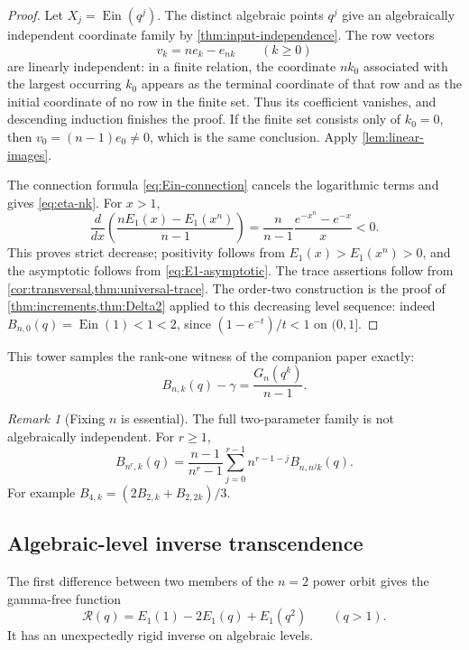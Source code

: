 \documentclass[11pt]{article}
\theoremstyle{definition}
\theoremstyle{remark}
\newtheorem{remark}[theorem]{Remark}
\newcommand{\Ein}{\operatorname{Ein}}
\begin{document}
\begin{proof}
Let \(X_j=\Ein(q^j)\).  The distinct algebraic points \(q^j\) give an
algebraically independent coordinate family by
\cref{thm:input-independence}.  The row vectors
\[
 v_k=ne_k-e_{nk}\qquad(k\ge0)
\]
are linearly independent: in a finite relation, the coordinate \(nk_0\)
associated with the largest occurring \(k_0\) appears as the terminal
coordinate of that row and as the initial coordinate of no row in the
finite set.  Thus its coefficient vanishes, and descending induction
finishes the proof.  If the finite set consists only of \(k_0=0\), then
\(v_0=(n-1)e_0\ne0\), which is the same conclusion.  Apply
\cref{lem:linear-images}.

The connection formula \eqref{eq:Ein-connection} cancels the logarithmic
terms and gives \eqref{eq:eta-nk}.  For \(x>1\),
\[
 \frac d{dx}\left(
 \frac{nE_1(x)-E_1(x^n)}{n-1}\right)
 =\frac n{n-1}\frac{e^{-x^n}-e^{-x}}x<0.
\]
This proves strict decrease; positivity follows from
\(E_1(x)>E_1(x^n)>0\), and the asymptotic follows from
\eqref{eq:E1-asymptotic}.  The trace assertions follow from
\cref{cor:transversal,thm:universal-trace}.  The order-two construction is
the proof of \cref{thm:increments,thm:Delta2} applied to this decreasing
level sequence: indeed \(B_{n,0}(q)=\Ein(1)<1<2\), since
\((1-e^{-t})/t<1\) on \((0,1]\).
\end{proof}

This tower samples the rank-one witness of the companion paper exactly:
\begin{equation}\label{eq:B-Gn}
 B_{n,k}(q)-\gamma=\frac{G_n(q^k)}{n-1}.
\end{equation}

\begin{remark}[Fixing \(n\) is essential]
The full two-parameter family is not algebraically independent.  For
\(r\ge1\),
\begin{equation}\label{eq:cross-n-relation}
 B_{n^r,k}(q)=\frac{n-1}{n^r-1}
 \sum_{j=0}^{r-1}n^{r-1-j}B_{n,n^jk}(q).
\end{equation}
For example \(B_{4,k}=(2B_{2,k}+B_{2,2k})/3\).
\end{remark}

\subsection{Algebraic-level inverse transcendence}

The first difference between two members of the \(n=2\) power orbit gives
the gamma-free function
\begin{equation}\label{eq:scriptR-def}
 \mathscr R(q)=E_1(1)-2E_1(q)+E_1(q^2)\qquad(q>1).
\end{equation}
It has an unexpectedly rigid inverse on algebraic levels.
\end{document}
